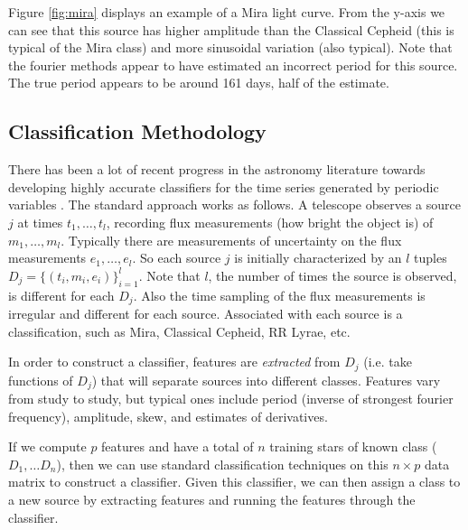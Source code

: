 \documentclass[10pt]{article}
\theoremstyle{definition}
\begin{document}
Figure \ref{fig:mira} displays an example of a Mira light curve. From the y-axis we can see that this source has higher amplitude than the Classical Cepheid (this is typical of the Mira class) and more sinusoidal variation (also typical). Note that the fourier methods appear to have estimated an incorrect period for this source. The true period appears to be around 161 days, half of the estimate.
\subsection{Classification Methodology}
There has been a lot of recent progress in the astronomy literature towards developing highly accurate classifiers for the time series generated by periodic variables \cite{debosscher2007automated,richards2011machine,dubath2011random}. The standard approach works as follows. A telescope observes a source $j$ at times $t_{1},\ldots,t_{l}$, recording flux measurements (how bright the object is) of $m_{1},\ldots,m_{l}$. Typically there are measurements of uncertainty on the flux measurements $e_{1},\ldots,e_{l}$. So each source $j$ is initially characterized by an $l$ tuples $D_j=\{(t_{i},m_{i},e_{i})\}_{i=1}^{l}$. Note that $l$, the number of times the source is observed, is different for each $D_j$. Also the time sampling of the flux measurements is irregular and different for each source. Associated with each source is a classification, such as Mira, Classical Cepheid, RR Lyrae, etc.

In order to construct a classifier, features are \textit{extracted} from $D_j$ (i.e. take functions of $D_j$) that will separate sources into different classes. Features vary from study to study, but typical ones include period (inverse of strongest fourier frequency), amplitude, skew, and estimates of derivatives.

If we compute $p$ features and have a total of $n$ training stars of known class ($D_1, \ldots D_n$), then we can use standard classification techniques on this $n\times p$ data matrix to construct a classifier. Given this classifier, we can then assign a class to a new source by extracting features and running the features through the classifier.
\end{document}
